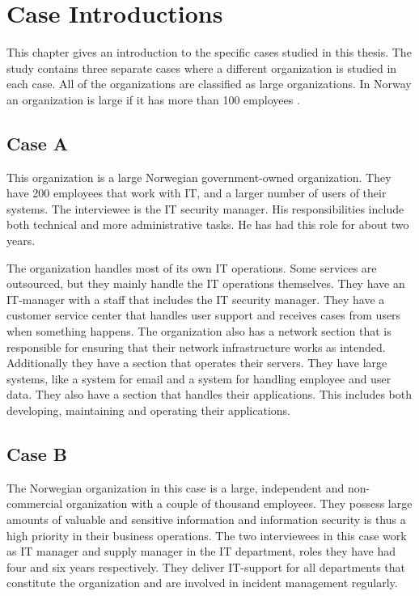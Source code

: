 \chapter{Case Introductions}
\label{chp:CaseIntroductions}
This chapter gives an introduction to the specific cases studied in this thesis. The study contains three separate cases where a different organization is studied in each case. All of the organizations are classified as large organizations. In Norway an organization is large if it has more than 100 employees \cite{SMB}.

\section{Case A}
This organization is a large Norwegian government-owned organization. They have 200 employees that work with IT, and a larger number of users of their systems. The interviewee is the IT security manager. His responsibilities include both technical and more administrative tasks. He has had this role for about two years.

The organization handles most of its own IT operations. Some services are outsourced, but they mainly handle the IT operations themselves. They have an IT-manager with a staff that includes the IT security manager. They have a customer service center %
that handles user support and receives cases from users when something happens. The organization also has a network section that is responsible for ensuring that their network infrastructure works as intended. Additionally they have  a section that operates their servers. They have large systems, like a system for email and a system for handling employee and user data. They also have a section that handles their applications. This includes both developing, maintaining and operating their applications.

\section{Case B}
The Norwegian organization in this case is a large, independent and non-commercial organization with a couple of thousand employees. They possess large amounts of valuable and sensitive information and information security is thus a high priority in their business operations. The two interviewees in this case work as IT manager and supply manager in the IT department, roles they have had four and six years respectively. They deliver IT-support for all departments that constitute the organization and are involved in incident management regularly.   

